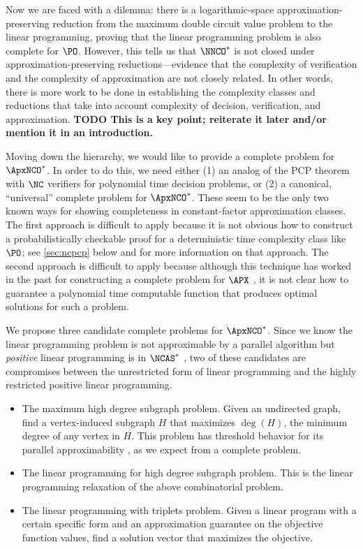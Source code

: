 \documentclass{article}
\newcommand{\todo}[1]{\textbf{TODO #1}}
\begin{document}
Now we are faced with a dilemma: there is a logarithmic-space approximation-preserving reduction from the maximum double circuit value problem to the linear programming, proving that the linear programming problem is also complete for $\PO$.
However, this tells us that $\NNCO^*$ is not closed under approximation-preserving reductions---evidence that the complexity of verification and the complexity of approximation are not closely related.
In other words, there is more work to be done in establishing the complexity classes and reductions that take into account complexity of decision, verification, and approximation.
\todo{This is a key point; reiterate it later and/or mention it in an introduction.}

Moving down the hierarchy, we would like to provide a complete problem for $\ApxNCO^*$.
In order to do this, we need either (1) an analog of the PCP theorem with $\NC$ verifiers for polynomial time decision problems, or (2) a canonical, ``universal'' complete problem for $\ApxNCO^*$.
These seem to be the only two known ways for showing completeness in constant-factor approximation classes.
The first approach is difficult to apply because it is not obvious how to construct a probabilistically checkable proof for a deterministic time complexity class like $\PO$; see \autoref{sec:ncpcp} below and \autocite{ncpcp} for more information on that approach.
The second approach is difficult to apply because although this technique has worked in the past for constructing a complete problem for $\APX$ \autocite[Lemma~2]{cp91}, it is not clear how to guarantee a polynomial time computable function that produces optimal solutions for such a problem.

We propose three candidate complete problems for $\ApxNCO^*$.
Since we know the linear programming problem is not approximable by a parallel algorithm but \emph{positive} linear programming is in $\NCAS^*$ \autocite{ln93}, two of these candidates are compromises between the unrestricted form of linear programming and the highly restricted positive linear programming.
\begin{itemize}
\item
  The maximum high degree subgraph problem.
  Given an undirected graph, find a vertex-induced subgraph $H$ that maximizes $\deg(H)$, the minimum degree of any vertex in $H$.
  This problem has threshold behavior for its parallel approximability \autocite{am84}, as we expect from a complete problem.
\item
  The linear programming for high degree subgraph problem.
  This is the linear programming relaxation of the above combinatorial problem.
\item
  The linear programming with triplets problem.
  Given a linear program with a certain specific form and an approximation guarantee on the objective function values, find a solution vector that maximizes the objective.
\end{itemize}
\end{document}

